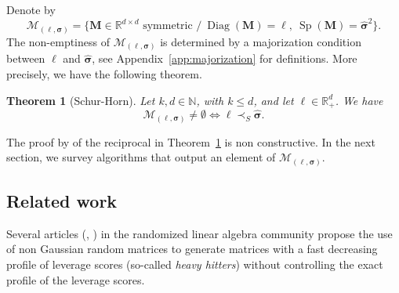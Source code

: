 \documentclass[twoside,11pt]{book}
\newtheorem{theorem}{Theorem}
\numberwithin{theorem}{chapter}
\numberwithin{definition}{chapter}
\numberwithin{proposition}{chapter}
\numberwithin{corollary}{chapter}
\numberwithin{example}{chapter}
\numberwithin{lemma}{chapter}
\numberwithin{assumption}{chapter}
\numberwithin{equation}{chapter}
\numberwithin{figure}{chapter}
\DeclareMathOperator{\Sp}{\mathrm{Sp}}
\DeclareMathOperator{\Diag}{\mathrm{Diag}}
\begin{document}
\begin{subappendices}
Denote by
\begin{equation}
\mathcal{M}_{(\bm{\ell},\bm{\sigma})} =  \{ \bm{M} \in \mathbb{R}^{d\times d}\text{ symmetric } \big/~  \Diag(\bm{M}) = \bm{\ell}, ~\Sp(\bm{M}) = \bm{\hat{\sigma}}^2\}.
\end{equation}
The non-emptiness of $\mathcal{M}_{(\bm{\ell},\bm{\sigma})}$ is determined by a majorization condition between $\bm{\ell}$ and $\hat{\bm{\sigma}}$, see Appendix~\ref{app:majorization} for definitions. More precisely, we have the following theorem.
\begin{theorem}[Schur-Horn]\label{thm:majorization_equivalence}
Let $k,d \in \mathbb{N}$, with $k \leq d$, and let $\bm{\ell} \in \mathbb{R}_{+}^{d}$. We have
\begin{equation}\label{eq:nonemptiness_majorization_equivalence}
\mathcal{M}_{(\bm{\ell},\bm{\sigma})} \neq \emptyset \Leftrightarrow \bm{\ell} \prec_{S} \hat{\bm{\sigma}}.
\end{equation}
\end{theorem}
The proof by \cite{Hor54} of the reciprocal in Theorem~\ref{thm:majorization_equivalence} is non constructive. In the next section, we survey algorithms that output an element of $\mathcal{M}_{(\bm{\ell},\bm{\sigma})}$.

\subsection{Related work}

Several articles (\citealp{RaMa14}, \citealp{MaMaYu14}) in the randomized linear algebra community propose the use of non Gaussian random matrices to generate matrices with a fast decreasing profile of leverage scores (so-called \emph{heavy hitters}) without controlling the exact profile of the leverage scores.


\end{subappendices}
\end{document}

